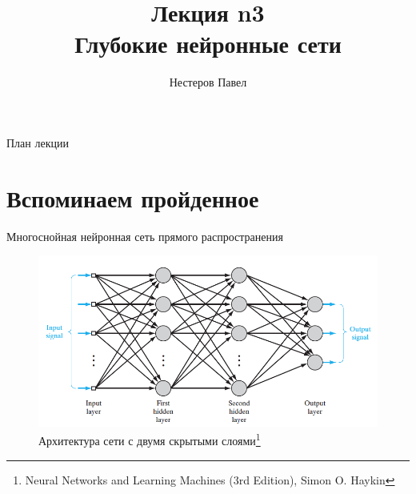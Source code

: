 \documentclass[10pt]{beamer}
\author{Нестеров Павел}
\title{\newline \newline \newline Лекция n3 \\ Глубокие нейронные сети}
\let\otp\titlepage
\renewcommand{\titlepage}{\otp\addtocounter{framenumber}{-1}}
\begin{document}
\begin{frame}[plain]
\titlepage
\end{frame}

\begin{frame}{План лекции}
\tableofcontents
\end{frame}


\section{Вспоминаем пройденное}


\begin{frame}{Многоснойная нейронная сеть прямого распространения}

\begin{figure}[h!]
  \centering
  \includegraphics[width=1\textwidth]{images/mlp.png}
  \caption{Архитектура сети с двумя скрытыми слоями\footnote{Neural Networks and Learning Machines (3rd Edition), Simon O. Haykin}}
\end{figure}

\end{frame}
\end{document}
